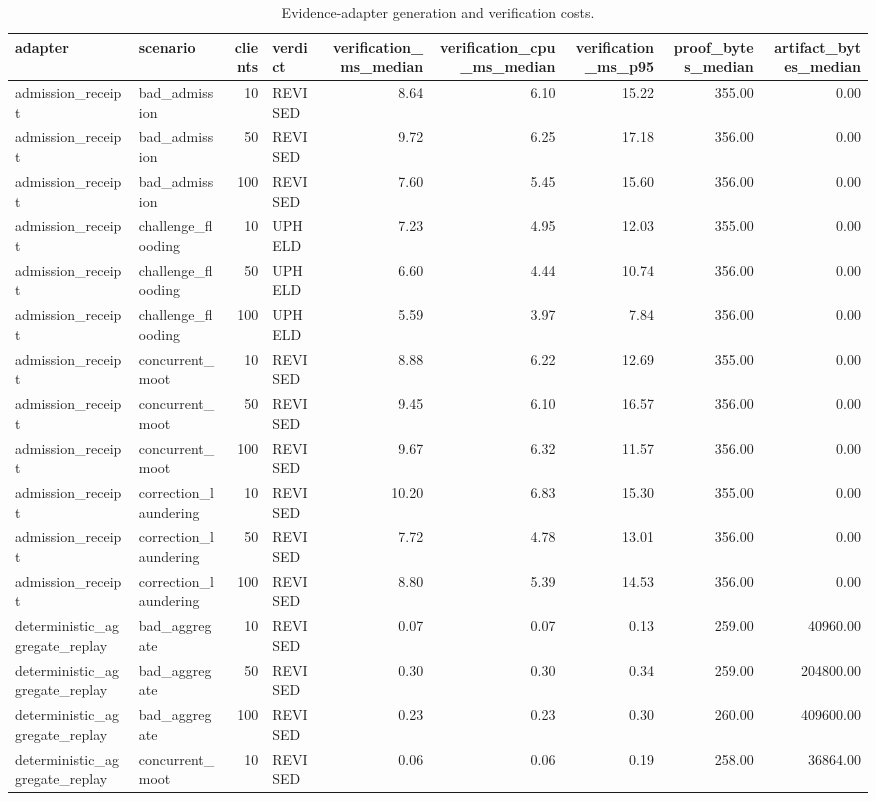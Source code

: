 \begin{table}
\caption{Evidence-adapter generation and verification costs.}
\label{tab:contestfl-adapters}
\begin{tabular}{llrlrrrrr}
\toprule
adapter & scenario & clients & verdict & verification\_ms\_median & verification\_cpu\_ms\_median & verification\_ms\_p95 & proof\_bytes\_median & artifact\_bytes\_median \\
\midrule
admission\_receipt & bad\_admission & 10 & REVISED & 8.64 & 6.10 & 15.22 & 355.00 & 0.00 \\
admission\_receipt & bad\_admission & 50 & REVISED & 9.72 & 6.25 & 17.18 & 356.00 & 0.00 \\
admission\_receipt & bad\_admission & 100 & REVISED & 7.60 & 5.45 & 15.60 & 356.00 & 0.00 \\
admission\_receipt & challenge\_flooding & 10 & UPHELD & 7.23 & 4.95 & 12.03 & 355.00 & 0.00 \\
admission\_receipt & challenge\_flooding & 50 & UPHELD & 6.60 & 4.44 & 10.74 & 356.00 & 0.00 \\
admission\_receipt & challenge\_flooding & 100 & UPHELD & 5.59 & 3.97 & 7.84 & 356.00 & 0.00 \\
admission\_receipt & concurrent\_moot & 10 & REVISED & 8.88 & 6.22 & 12.69 & 355.00 & 0.00 \\
admission\_receipt & concurrent\_moot & 50 & REVISED & 9.45 & 6.10 & 16.57 & 356.00 & 0.00 \\
admission\_receipt & concurrent\_moot & 100 & REVISED & 9.67 & 6.32 & 11.57 & 356.00 & 0.00 \\
admission\_receipt & correction\_laundering & 10 & REVISED & 10.20 & 6.83 & 15.30 & 355.00 & 0.00 \\
admission\_receipt & correction\_laundering & 50 & REVISED & 7.72 & 4.78 & 13.01 & 356.00 & 0.00 \\
admission\_receipt & correction\_laundering & 100 & REVISED & 8.80 & 5.39 & 14.53 & 356.00 & 0.00 \\
deterministic\_aggregate\_replay & bad\_aggregate & 10 & REVISED & 0.07 & 0.07 & 0.13 & 259.00 & 40960.00 \\
deterministic\_aggregate\_replay & bad\_aggregate & 50 & REVISED & 0.30 & 0.30 & 0.34 & 259.00 & 204800.00 \\
deterministic\_aggregate\_replay & bad\_aggregate & 100 & REVISED & 0.23 & 0.23 & 0.30 & 260.00 & 409600.00 \\
deterministic\_aggregate\_replay & concurrent\_moot & 10 & REVISED & 0.06 & 0.06 & 0.19 & 258.00 & 36864.00 \\

\end{tabular}
\end{table}
